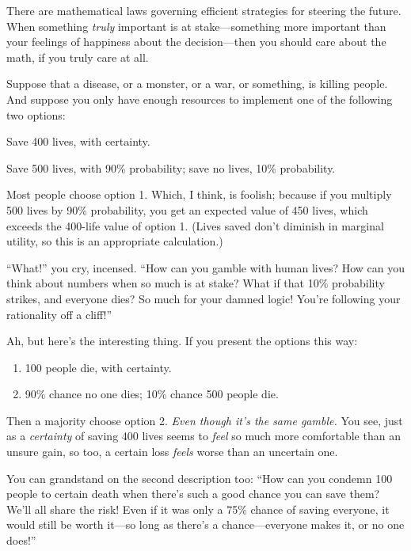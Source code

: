  There are mathematical laws governing efficient strategies for
steering the future. When something \textit{truly} important is at
stake---something more important than your feelings of happiness about
the decision---then you should care about the math, if you truly care
at all.

\myendsectiontext


\bigskip



 Suppose that a disease, or a monster, or a war, or something, is
killing people. And suppose you only have enough resources to implement
one of the following two options:


 Save 400 lives, with certainty.


 Save 500 lives, with 90\% probability; save no lives, 10\%
probability.


 Most people choose option 1. Which, I think, is foolish; because
if you multiply 500 lives by 90\% probability, you get an expected
value of 450 lives, which exceeds the 400-life value of option 1.
(Lives saved don't diminish in marginal utility, so
this is an appropriate calculation.)


 ``What!'' you cry, incensed.
``How can you gamble with human lives? How can you
think about numbers when so much is at stake? What if that 10\%
probability strikes, and everyone dies? So much for your damned logic!
You're following your rationality off a
cliff!''


 Ah, but here's the interesting thing. If you
present the options this way:

\begin{enumerate}
\item {
 100 people die, with certainty.}

\item {
  90\% chance no one dies; 10\% chance 500 people die.}
\end{enumerate}


 Then a majority choose option 2. \textit{Even though
it's the same gamble.} You see, just as a
\textit{certainty} of saving 400 lives seems to \textit{feel} so much
more comfortable than an unsure gain, so too, a certain loss
\textit{feels} worse than an uncertain one.


 You can grandstand on the second description too:
``How can you condemn 100 people to certain death when
there's such a good chance you can save them?
We'll all share the risk! Even if it was only a 75\%
chance of saving everyone, it would still be worth it---so long as
there's a chance---everyone makes it, or no one
does!''


